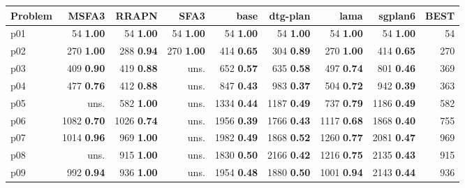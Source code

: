 \begin{tabular}{|l|rrrrrrr|r|}
\hline
\textbf{Problem} & \textbf{MSFA3} & \textbf{RRAPN} & \textbf{SFA3} & \textbf{base} & \textbf{dtg-plan} & \textbf{lama} & \textbf{sgplan6} & \textbf{BEST}\\
\hline
p01 & {\footnotesize 54} \textbf{1.00} & {\footnotesize 54} \textbf{1.00} & {\footnotesize 54} \textbf{1.00} & {\footnotesize 54} \textbf{1.00} & {\footnotesize 54} \textbf{1.00} & {\footnotesize 54} \textbf{1.00} & {\footnotesize 54} \textbf{1.00} & 54\\
p02 & {\footnotesize 270} \textbf{1.00} & {\footnotesize 288} \textbf{0.94} & {\footnotesize 270} \textbf{1.00} & {\footnotesize 414} \textbf{0.65} & {\footnotesize 304} \textbf{0.89} & {\footnotesize 270} \textbf{1.00} & {\footnotesize 414} \textbf{0.65} & 270\\
p03 & {\footnotesize 409} \textbf{0.90} & {\footnotesize 419} \textbf{0.88} & uns. & {\footnotesize 652} \textbf{0.57} & {\footnotesize 635} \textbf{0.58} & {\footnotesize 497} \textbf{0.74} & {\footnotesize 801} \textbf{0.46} & 369\\
p04 & {\footnotesize 477} \textbf{0.76} & {\footnotesize 412} \textbf{0.88} & uns. & {\footnotesize 847} \textbf{0.43} & {\footnotesize 983} \textbf{0.37} & {\footnotesize 504} \textbf{0.72} & {\footnotesize 942} \textbf{0.39} & 363\\
p05 & uns. & {\footnotesize 582} \textbf{1.00} & uns. & {\footnotesize 1334} \textbf{0.44} & {\footnotesize 1187} \textbf{0.49} & {\footnotesize 737} \textbf{0.79} & {\footnotesize 1186} \textbf{0.49} & 582\\
p06 & {\footnotesize 1082} \textbf{0.70} & {\footnotesize 1026} \textbf{0.74} & uns. & {\footnotesize 1956} \textbf{0.39} & {\footnotesize 1766} \textbf{0.43} & {\footnotesize 1117} \textbf{0.68} & {\footnotesize 1868} \textbf{0.40} & 755\\
p07 & {\footnotesize 1014} \textbf{0.96} & {\footnotesize 969} \textbf{1.00} & uns. & {\footnotesize 1982} \textbf{0.49} & {\footnotesize 1868} \textbf{0.52} & {\footnotesize 1260} \textbf{0.77} & {\footnotesize 2081} \textbf{0.47} & 969\\
p08 & uns. & {\footnotesize 915} \textbf{1.00} & uns. & {\footnotesize 1830} \textbf{0.50} & {\footnotesize 2166} \textbf{0.42} & {\footnotesize 1216} \textbf{0.75} & {\footnotesize 2135} \textbf{0.43} & 915\\
p09 & {\footnotesize 992} \textbf{0.94} & {\footnotesize 936} \textbf{1.00} & uns. & {\footnotesize 1954} \textbf{0.48} & {\footnotesize 1880} \textbf{0.50} & {\footnotesize 1001} \textbf{0.94} & {\footnotesize 2143} \textbf{0.44} & 936\\

\end{tabular}
